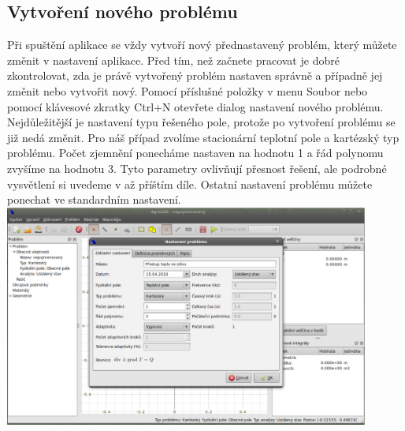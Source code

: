 \documentclass[a4paper, oneside]{article}
\begin{document}
\subsection{Vytvoření nového problému}
Při spuštění aplikace se vždy vytvoří nový přednastavený problém, který můžete změnit v nastavení aplikace. Před tím, než začnete pracovat je dobré zkontrolovat, zda je právě vytvořený problém nastaven správně a případně jej změnit nebo vytvořit nový. Pomocí příslušné položky v menu Soubor nebo pomocí klávesové zkratky Ctrl+N otevřete dialog nastavení nového problému. Nejdůležitější je nastavení typu řešeného pole, protože po vytvoření problému se již nedá změnit. Pro náš případ zvolíme stacionární teplotní pole a kartézský typ problému. Počet zjemnění ponecháme nastaven na hodnotu 1 a řád polynomu zvyšíme na hodnotu 3. Tyto parametry ovlivňují přesnost řešení, ale podrobné vysvětlení si uvedeme v až příštím díle. Ostatní nastavení problému můžete ponechat ve standardním nastavení.\\
\includegraphics[width=12cm]{nastaveni_problemu.eps}
\end{document}
